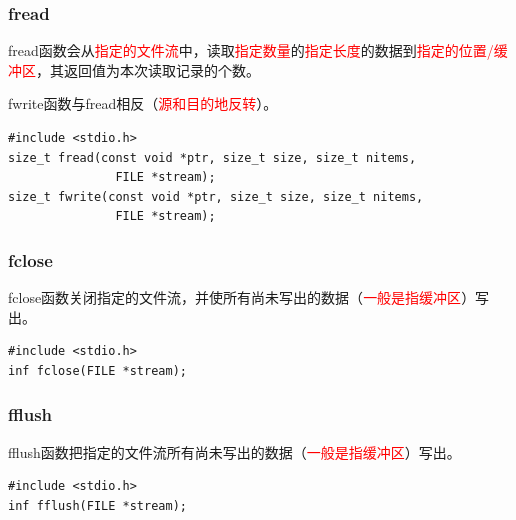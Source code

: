 \documentclass{beamer}
\begin{document}
\begin{frame}[fragile]
\frametitle{fread}
fread函数会从\textcolor{red}{指定的文件流}中，读取\textcolor{red}{指定数量}的\textcolor{red}{指定长度}的数据到\textcolor{red}{指定的位置/缓冲区}，其返回值为本次读取记录的个数。

fwrite函数与fread相反（\textcolor{red}{源和目的地反转}）。
\begin{example}
\begin{verbatim}
#include <stdio.h>
size_t fread(const void *ptr, size_t size, size_t nitems, 
               FILE *stream);
size_t fwrite(const void *ptr, size_t size, size_t nitems, 
               FILE *stream);
\end{verbatim}
\end{example}

\end{frame}

\begin{frame}[fragile]
\frametitle{fclose}
fclose函数关闭指定的文件流，并使所有尚未写出的数据（\textcolor{red}{一般是指缓冲区}）写出。
\begin{example}[fclose函数原型]
\begin{verbatim}
#include <stdio.h>
inf fclose(FILE *stream);
\end{verbatim}
\end{example}

\end{frame}
\begin{frame}[fragile]
\frametitle{fflush}
fflush函数把指定的文件流所有尚未写出的数据（\textcolor{red}{一般是指缓冲区}）写出。
\begin{example}[fflush函数原型]
\begin{verbatim}
#include <stdio.h>
inf fflush(FILE *stream);
\end{verbatim}
\end{example}

\end{frame}
\end{document}

